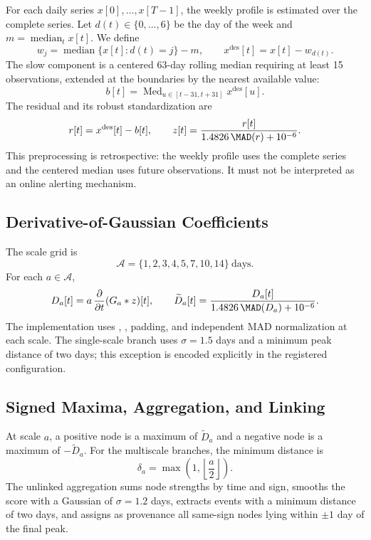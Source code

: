 For each daily series $x[0],\ldots,x[T-1]$, the weekly profile is estimated over the complete series. Let $d(t)\in\{0,\ldots,6\}$ be the day of the week and $m=\operatorname{median}_t x[t]$. We define
\begin{equation}
 w_j=\operatorname{median}\{x[t]:d(t)=j\}-m,
 \qquad
 x^{\mathrm{des}}[t]=x[t]-w_{d(t)}.
\end{equation}
The slow component is a centered 63-day rolling median requiring at least 15 observations, extended at the boundaries by the nearest available value:
\begin{equation}
 b[t]=\operatorname{Med}_{u\in[t-31,t+31]}x^{\mathrm{des}}[u].
\end{equation}
The residual and its robust standardization are
\begin{equation}
 r[t]=x^{\mathrm{des}}[t]-b[t],
 \qquad
 z[t]=\frac{r[t]}{1.4826\,\MAD(r)+10^{-6}}.
\end{equation}
This preprocessing is retrospective: the weekly profile uses the complete series and the centered median uses future observations. It must not be interpreted as an online alerting mechanism.

\subsection{Derivative-of-Gaussian Coefficients}

The scale grid is
\begin{equation}
 \mathcal{A}=\{1,2,3,4,5,7,10,14\}\ \text{days}.
\end{equation}
For each $a\in\mathcal{A}$,
\begin{equation}
 D_a[t]=a\,\frac{\partial}{\partial t}(G_a*z)[t],
 \qquad
 \widetilde D_a[t]=\frac{D_a[t]}{1.4826\,\MAD(D_a)+10^{-6}}.
\end{equation}
The implementation uses , ,  padding, and independent MAD normalization at each scale. The single-scale branch uses $\sigma=1.5$ days and a minimum peak distance of two days; this exception is encoded explicitly in the registered configuration.

\subsection{Signed Maxima, Aggregation, and Linking}

At scale $a$, a positive node is a maximum of $\widetilde D_a$ and a negative node is a maximum of $-\widetilde D_a$. For the multiscale branches, the minimum distance is
\begin{equation}
 \delta_a=\max\left(1,\left\lfloor\frac{a}{2}\right\rfloor\right).
\end{equation}
The unlinked aggregation sums node strengths by time and sign, smooths the score with a Gaussian of $\sigma=1.2$ days, extracts events with a minimum distance of two days, and assigns as provenance all same-sign nodes lying within $\pm1$ day of the final peak.

